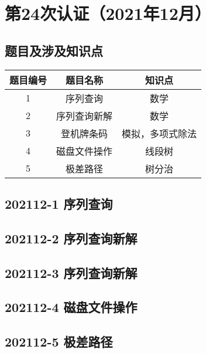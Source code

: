 \documentclass[cn,10pt,math=newtx,citestyle=gb7714-2015,bibstyle=gb7714-2015]{elegantbook}
\newif\ifonlyanalyze %
\begin{document}

\chapter{第24次认证（2021年12月）}

\section{题目及涉及知识点}

\begin{table}[htbp]
  \centering
  \begin{tabular}{ccc}
    \toprule
    题目编号 & 题目名称 & 知识点\\
    \midrule
    1 & 序列查询 & 数学\\
    2 & 序列查询新解 & 数学\\
    3 & 登机牌条码 & 模拟，多项式除法\\
    4 & 磁盘文件操作 & 线段树\\
    5 & 极差路径 & 树分治\\
    \bottomrule
  \end{tabular}
\end{table}

\newpage
\section{202112-1 序列查询}
\ifonlyanalyze
\else

\fi


\newpage
\section{202112-2 序列查询新解}
\ifonlyanalyze
\else

\fi


\newpage
\section{202112-3 序列查询新解}
\ifonlyanalyze
\else

\fi


\newpage
\section{202112-4 磁盘文件操作}
\ifonlyanalyze
\else

\fi


\newpage
\section{202112-5 极差路径}
\ifonlyanalyze
\else

\fi

\end{document}
